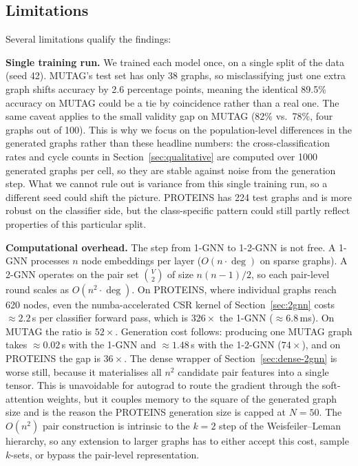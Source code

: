 \documentclass[12pt,a4paper]{article}
\begin{document}
\subsection{Limitations}
\label{sec:limitations}

Several limitations qualify the findings:

\textbf{Single training run.} We trained each model once, on a single split of the data (seed 42). MUTAG's test set has only 38 graphs, so misclassifying just one extra graph shifts accuracy by 2.6 percentage points, meaning the identical 89.5\% accuracy on MUTAG could be a tie by coincidence rather than a real one. The same caveat applies to the small validity gap on MUTAG (82\% vs.\ 78\%, four graphs out of 100). This is why we focus on the population-level differences in the generated graphs rather than these headline numbers: the cross-classification rates and cycle counts in Section~\ref{sec:qualitative} are computed over 1000 generated graphs per cell, so they are stable against noise from the generation step. What we cannot rule out is variance from this single training run, so a different seed could shift the picture. PROTEINS has 224 test graphs and is more robust on the classifier side, but the class-specific pattern could still partly reflect properties of this particular split.

\textbf{Computational overhead.}\label{sec:overhead} The step from 1-GNN to 1-2-GNN is not free. A 1-GNN processes $n$ node embeddings per layer ($O(n \cdot \deg)$ on sparse graphs). A 2-GNN operates on the pair set $\binom{V}{2}$ of size $n(n{-}1)/2$, so each pair-level round scales as $O(n^2 \cdot \deg)$. On PROTEINS, where individual graphs reach 620 nodes, even the numba-accelerated CSR kernel of Section~\ref{sec:2gnn} costs $\approx 2.2$\,s per classifier forward pass, which is $326\times$ the 1-GNN ($\approx 6.8$\,ms). On MUTAG the ratio is $52\times$. Generation cost follows: producing one MUTAG graph takes $\approx 0.02$\,s with the 1-GNN and $\approx 1.48$\,s with the 1-2-GNN ($74\times$), and on PROTEINS the gap is $36\times$. The dense wrapper of Section~\ref{sec:dense-2gnn} is worse still, because it materialises all $n^2$ candidate pair features into a single tensor. This is unavoidable for autograd to route the gradient through the soft-attention weights, but it couples memory to the square of the generated graph size and is the reason the PROTEINS generation size is capped at $N = 50$. The $O(n^2)$ pair construction is intrinsic to the $k = 2$ step of the Weisfeiler--Leman hierarchy, so any extension to larger graphs has to either accept this cost, sample $k$-sets, or bypass the pair-level representation.
\end{document}
